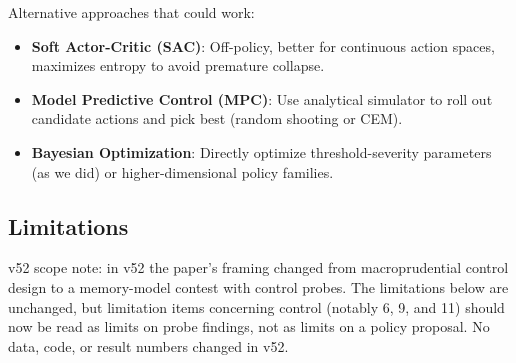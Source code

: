 \documentclass[11pt]{article}
\begin{document}
Alternative approaches that could work:

\begin{itemize}
\item \textbf{Soft Actor-Critic (SAC)}: Off-policy, better for continuous action spaces, maximizes entropy to avoid premature collapse.
\item \textbf{Model Predictive Control (MPC)}: Use analytical simulator to roll out candidate actions and pick best (random shooting or CEM).
\item \textbf{Bayesian Optimization}: Directly optimize threshold-severity parameters (as we did) or higher-dimensional policy families.
\end{itemize}

\subsection{Limitations}
v52 scope note: in v52 the paper's framing changed from macroprudential control design to a memory-model contest with control probes. The limitations below are unchanged, but limitation items concerning control (notably 6, 9, and 11) should now be read as limits on probe findings, not as limits on a policy proposal. No data, code, or result numbers changed in v52.
\end{document}
